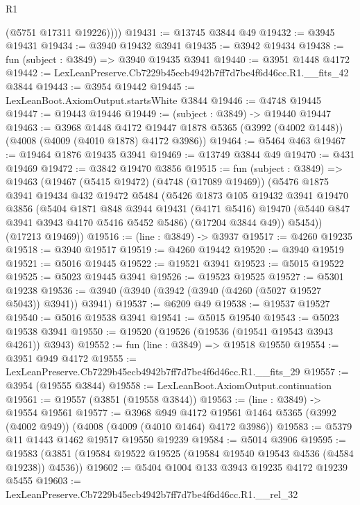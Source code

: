 \begin{lexlean}{R1}
\begin{coremodule}
          (@5751 @17311 @19226))))
@19431 := @13745 @3844 @49
@19432 := @3945 @19431
@19434 := @3940 @19432 @3941
@19435 := @3942 @19434
@19438 := fun (subject : @3849) => @3940 @19435 @3941
@19440 := @3951 @1448 @4172
@19442 := LexLeanPreserve.Cb7229b45ecb4942b7ff7d7be4f6d46cc.R1.__fits_42 @3844
@19443 := @3954 @19442
@19445 := LexLeanBoot.AxiomOutput.startsWhite @3844
@19446 := @4748 @19445
@19447 := @19443 @19446
@19449 := (subject : @3849) -> @19440 @19447
@19463 := @3968
    @1448
    @4172
    @19447
    @1878
    @5365
    (@3992 (@4002 @1448))
    (@4008 (@4009 (@4010 @1878) @4172 @3986))
@19464 := @5464 @463
@19467 := @19464 @1876 @19435 @3941
@19469 := @13749 @3844 @49
@19470 := @431 @19469
@19472 := @3842 @19470 @3856
@19515 := fun (subject : @3849) =>
  @19463
    (@19467
      (@5415 @19472)
      (@4748 (@17089 @19469))
      (@5476
        @1875
        @3941
        @19434
        @432
        @19472
        @5484
        (@5426
          @1873
          @105
          @19432
          @3941
          @19470
          @3856
          (@5404
            @1871
            @848
            @3944
            @19431
            (@4171 @5416)
            @19470
            (@5440 @847 @3941 @3943 @4170 @5416 @5452 @5486)
            (@17204 @3844 @49))
          @5454))
      (@17213 @19469))
@19516 := (line : @3849) -> @3937
@19517 := @4260 @19235
@19518 := @3940 @19517
@19519 := @4260 @19442
@19520 := @3940 @19519
@19521 := @5016 @19445
@19522 := @19521 @3941
@19523 := @5015 @19522
@19525 := @5023 @19445 @3941
@19526 := @19523 @19525
@19527 := @5301 @19238
@19536 := @3940 (@3940 (@3942 (@3940 (@4260 (@5027 @19527 @5043)) @3941)) @3941)
@19537 := @6209 @49
@19538 := @19537 @19527
@19540 := @5016 @19538 @3941
@19541 := @5015 @19540
@19543 := @5023 @19538 @3941
@19550 := @19520 (@19526 (@19536 (@19541 @19543 @3943 @4261)) @3943)
@19552 := fun (line : @3849) => @19518 @19550
@19554 := @3951 @949 @4172
@19555 := LexLeanPreserve.Cb7229b45ecb4942b7ff7d7be4f6d46cc.R1.__fits_29
@19557 := @3954 (@19555 @3844)
@19558 := LexLeanBoot.AxiomOutput.continuation
@19561 := @19557 (@3851 (@19558 @3844))
@19563 := (line : @3849) -> @19554 @19561
@19577 := @3968
    @949
    @4172
    @19561
    @1464
    @5365
    (@3992 (@4002 @949))
    (@4008 (@4009 (@4010 @1464) @4172 @3986))
@19583 := @5379 @11 @1443 @1462 @19517 @19550 @19239
@19584 := @5014 @3906
@19595 := @19583 (@3851 (@19584 @19522 @19525 (@19584 @19540 @19543 @4536 (@4584 @19238)) @4536))
@19602 := @5404 @1004 @133 @3943 @19235 @4172 @19239 @5455
@19603 := LexLeanPreserve.Cb7229b45ecb4942b7ff7d7be4f6d46cc.R1.__rel_32

\end{coremodule}
\end{lexlean}
